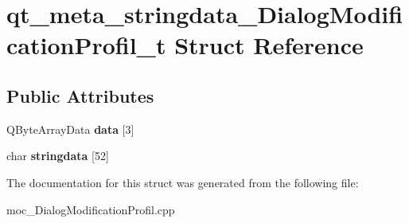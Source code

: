 \section{qt\-\_\-meta\-\_\-stringdata\-\_\-\-Dialog\-Modification\-Profil\-\_\-t Struct Reference}
\label{structqt__meta__stringdata___dialog_modification_profil__t}
\subsection*{Public Attributes}
\begin{DoxyCompactItemize}
\item 
Q\-Byte\-Array\-Data {\bfseries data} [3]\label{structqt__meta__stringdata___dialog_modification_profil__t_af7944ad815345eecbd3968bce03eeb15}

\item 
char {\bfseries stringdata} [52]\label{structqt__meta__stringdata___dialog_modification_profil__t_a3923043fb7c9c3d708e6d56951ee5b59}

\end{DoxyCompactItemize}


The documentation for this struct was generated from the following file\-:\begin{DoxyCompactItemize}
\item 
moc\-\_\-\-Dialog\-Modification\-Profil.\-cpp\end{DoxyCompactItemize}
